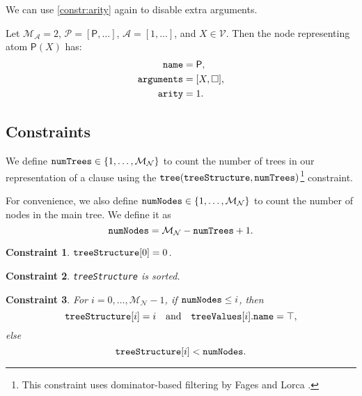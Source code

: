 \documentclass[runningheads]{llncs}
\newtheorem{constraint}{Constraint}
\newcommand{\variable}[1]{\texttt{\textup{#1}}}
\newcommand{\predicates}{\mathcal{P}}
\newcommand{\variables}{\mathcal{V}}
\newcommand{\arities}{\mathcal{A}}
\newcommand{\maxArity}{\mathcal{M}_{\mathcal{A}}}
\newcommand{\maxNumNodes}{\mathcal{M}_{\mathcal{N}}}
\begin{document}
We can use \cref{constr:arity} again to disable extra arguments.

\begin{example}
  Let $\maxArity{} = 2$, $\predicates{} = [\mathsf{P}, \dots]$, $\arities{}
  = [1, \dots]$, and $X \in \variables{}$. Then the node representing atom
  $\mathsf{P}(X)$ has:
  \begin{align*}
    \variable{name} &= \mathsf{P},\\
    \variable{arguments} &= [X, \Box],\\
    \variable{arity} &= 1.
  \end{align*}
\end{example}

\subsection{Constraints}

\begin{definition}
  We define $\variable{numTrees} \in \{ 1, \dots, \maxNumNodes{} \}$ to count
  the number of trees in our representation of a clause using the
  $\variable{tree}(\variable{treeStructure}, \variable{numTrees})$\footnote{This
    constraint uses dominator-based filtering by Fages and Lorca
    \cite{DBLP:conf/cp/FagesL11}.} constraint.
\end{definition}

\begin{definition}
  For convenience, we also define $\variable{numNodes} \in \{ 1, \dots,
  \maxNumNodes{} \}$ to count the number of nodes in the main tree. We define it
  as
  \[
    \variable{numNodes} = \maxNumNodes{} - \variable{numTrees} + 1.
  \]
\end{definition}

\begin{constraint}
  $\variable{treeStructure}[0] = 0$.
\end{constraint}

\begin{constraint}
  \variable{treeStructure} is sorted.
\end{constraint}

\begin{constraint}
  For $i = 0, \dots, \maxNumNodes{} - 1$, if $\variable{numNodes} \le
  i$, then
  \[
    \variable{treeStructure}[i] = i \quad \text{and} \quad
    \variable{treeValues}[i].\variable{name} = \top,
  \]
  else
  \[
    \variable{treeStructure}[i] < \variable{numNodes}.
  \]
\end{constraint}
\end{document}
